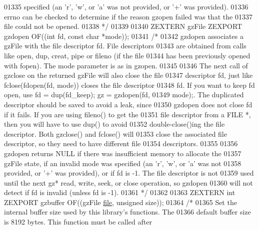 \begin{DoxyCode}
01335 \textcolor{comment}{   specified (an 'r', 'w', or 'a' was not provided, or '+' was provided).}
01336 \textcolor{comment}{   errno can be checked to determine if the reason gzopen failed was that the}
01337 \textcolor{comment}{   file could not be opened.}
01338 \textcolor{comment}{*/}
01339 
01340 ZEXTERN gzFile ZEXPORT gzdopen OF((\textcolor{keywordtype}{int} fd, \textcolor{keyword}{const} \textcolor{keywordtype}{char} *mode));
01341 \textcolor{comment}{/*}
01342 \textcolor{comment}{     gzdopen associates a gzFile with the file descriptor fd.  File descriptors}
01343 \textcolor{comment}{   are obtained from calls like open, dup, creat, pipe or fileno (if the file}
01344 \textcolor{comment}{   has been previously opened with fopen).  The mode parameter is as in gzopen.}
01345 \textcolor{comment}{}
01346 \textcolor{comment}{     The next call of gzclose on the returned gzFile will also close the file}
01347 \textcolor{comment}{   descriptor fd, just like fclose(fdopen(fd, mode)) closes the file descriptor}
01348 \textcolor{comment}{   fd.  If you want to keep fd open, use fd = dup(fd\_keep); gz = gzdopen(fd,}
01349 \textcolor{comment}{   mode);.  The duplicated descriptor should be saved to avoid a leak, since}
01350 \textcolor{comment}{   gzdopen does not close fd if it fails.  If you are using fileno() to get the}
01351 \textcolor{comment}{   file descriptor from a FILE *, then you will have to use dup() to avoid}
01352 \textcolor{comment}{   double-close()ing the file descriptor.  Both gzclose() and fclose() will}
01353 \textcolor{comment}{   close the associated file descriptor, so they need to have different file}
01354 \textcolor{comment}{   descriptors.}
01355 \textcolor{comment}{}
01356 \textcolor{comment}{     gzdopen returns NULL if there was insufficient memory to allocate the}
01357 \textcolor{comment}{   gzFile state, if an invalid mode was specified (an 'r', 'w', or 'a' was not}
01358 \textcolor{comment}{   provided, or '+' was provided), or if fd is -1.  The file descriptor is not}
01359 \textcolor{comment}{   used until the next gz* read, write, seek, or close operation, so gzdopen}
01360 \textcolor{comment}{   will not detect if fd is invalid (unless fd is -1).}
01361 \textcolor{comment}{*/}
01362 
01363 ZEXTERN \textcolor{keywordtype}{int} ZEXPORT gzbuffer OF((gzFile \hyperlink{structfile}{file}, \textcolor{keywordtype}{unsigned} size));
01364 \textcolor{comment}{/*}
01365 \textcolor{comment}{     Set the internal buffer size used by this library's functions.  The}
01366 \textcolor{comment}{   default buffer size is 8192 bytes.  This function must be called after}

\end{DoxyCode}
